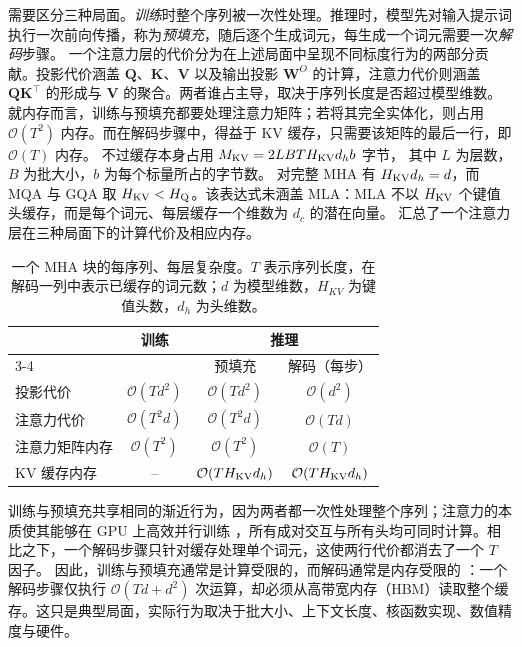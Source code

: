 \documentclass[11pt]{article}
\newcommand{\mat}[1]{\mathbf{#1}}
\begin{document}
需要区分三种局面。\emph{训练}时整个序列被一次性处理。推理时，模型先对输入提示词执行一次前向传播，称为\textit{预填充}，随后逐个生成词元，每生成一个词元需要一次\textit{解码}步骤。
一个注意力层的代价分为在上述局面中呈现不同标度行为的两部分贡献。投影代价涵盖 $\mat{Q}$、$\mat{K}$、$\mat{V}$ 以及输出投影 $\mat{W}^O$ 的计算，注意力代价则涵盖 $\mat{Q}\mat{K}^\top$ 的形成与 $\mat{V}$ 的聚合。两者谁占主导，取决于序列长度是否超过模型维数。
就内存而言，训练与预填充都要处理注意力矩阵；若将其完全实体化，则占用 $\mathcal{O}(T^2)$ 内存。而在解码步骤中，得益于 KV 缓存，只需要该矩阵的最后一行，即 $\mathcal{O}(T)$ 内存。
不过缓存本身占用 $M_{\rm KV} = 2 L B T H_{\rm KV} d_h b$ 字节，
其中 $L$ 为层数，$B$ 为批大小，$b$ 为每个标量所占的字节数。
对完整 MHA 有 $H_{\rm KV} d_h = d$，而 MQA 与 GQA 取 $H_{\rm KV} < H_{\rm Q}$。该表达式未涵盖 MLA：MLA 不以 $H_{\rm KV}$ 个键值头缓存，而是每个词元、每层缓存一个维数为 $d_c$ 的潜在向量。
 汇总了一个注意力层在三种局面下的计算代价及相应内存。
\begin{table}[h]
\centering
\caption{一个 MHA 块的每序列、每层复杂度。$T$ 表示序列长度，在解码一列中表示已缓存的词元数；$d$ 为模型维数，$H_{KV}$ 为键值头数，$d_h$ 为头维数。}
\label{tab:attention-complexity}
\begin{tabular}{lccc}
\toprule
 & \multirow{2}{*}{训练} & \multicolumn{2}{c}{推理} \\
\cmidrule(lr){3-4}
 & & 预填充 & 解码（每步） \\
\midrule
投影代价 & $\mathcal{O}(T d^2)$ & $\mathcal{O}(T d^2)$ & $\mathcal{O}(d^2)$ \\
注意力代价 & $\mathcal{O}(T^2 d)$ & $\mathcal{O}(T^2 d)$ & $\mathcal{O}(T d)$ \\
\midrule
注意力矩阵内存 & $\mathcal{O}(T^2)$ & $\mathcal{O}(T^2)$ & $\mathcal{O}(T)$ \\
KV 缓存内存 & -- & $\mathcal{O}(T H_{\rm KV} d_h)$ & $\mathcal{O}(T H_{\rm KV} d_h)$ \\
\bottomrule
\end{tabular}
\end{table}

训练与预填充共享相同的渐近行为，因为两者都一次性处理整个序列；注意力的本质使其能够在 GPU 上高效并行训练 \cite{vaswani2017attention}，所有成对交互与所有头均可同时计算。相比之下，一个解码步骤只针对缓存处理单个词元，这使两行代价都消去了一个 $T$ 因子。
因此，训练与预填充通常是计算受限的，而解码通常是内存受限的 \cite{yuan2024efficientinferencesurvey2}：一个解码步骤仅执行 $\mathcal{O}(Td + d^2)$ 次运算，却必须从高带宽内存（HBM）读取整个缓存。这只是典型局面，实际行为取决于批大小、上下文长度、核函数实现、数值精度与硬件。
\end{document}
